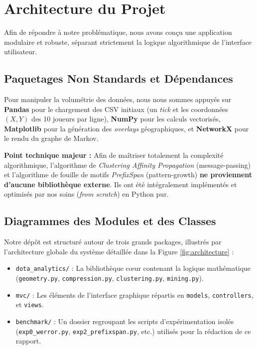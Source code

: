 \documentclass[11pt, a4paper]{article}
\begin{document}
\section{Architecture du Projet}

Afin de répondre à notre problématique, nous avons conçu une application modulaire et robuste, séparant strictement la logique algorithmique de l'interface utilisateur.

\subsection{Paquetages Non Standards et Dépendances}

Pour manipuler la volumétrie des données, nous nous sommes appuyés sur \textbf{Pandas} pour le chargement des CSV initiaux (un \textit{tick} et les coordonnées $(X,Y)$ des 10 joueurs par ligne), \textbf{NumPy} pour les calculs vectorisés, \textbf{Matplotlib} pour la génération des \textit{overlays} géographiques, et \textbf{NetworkX} pour le rendu du graphe de Markov. 

\textbf{Point technique majeur :} Afin de maîtriser totalement la complexité algorithmique, l'algorithme de \textit{Clustering Affinity Propagation} \cite{frey2007} (message-passing) et l'algorithme de fouille de motifs \textit{PrefixSpan} (pattern-growth) \textbf{ne proviennent d'aucune bibliothèque externe}. Ils ont été intégralement implémentés et optimisés par nos soins (\textit{from scratch}) en Python pur.

\subsection{Diagrammes des Modules et des Classes}

Notre dépôt est structuré autour de trois grands packages, illustrés par l'architecture globale du système détaillée dans la Figure \ref{fig:architecture} :
\begin{itemize}
    \item \texttt{dota\_analytics/} : La bibliothèque cœur contenant la logique mathématique (\texttt{geometry.py}, \texttt{compression.py}, \texttt{clustering.py}, \texttt{mining.py}).
    \item \texttt{mvc/} : Les éléments de l'interface graphique répartis en \texttt{models}, \texttt{controllers}, et \texttt{views}.
    \item \texttt{benchmark/} : Un dossier regroupant les scripts d'expérimentation isolés (\texttt{exp0\_werror.py}, \texttt{exp2\_prefixspan.py}, etc.) utilisés pour la rédaction de ce rapport.
\end{itemize}
\end{document}

